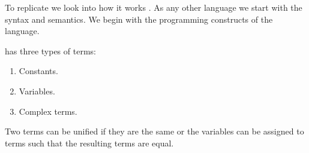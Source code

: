 \documentclass[thesis-solanki.tex]{subfiles}
\begin{document}
To replicate  we look into how it works \cite{webiste:learnprolognow}.
%
As any other language we start with the syntax and semantics.
We begin with the programming constructs of the language.

 has three types of terms:
\begin{enumerate}
\item Constants.

\item Variables.

\item Complex terms.
\end{enumerate}

Two terms can be unified if they are the same or the variables can be assigned to terms such that the resulting
terms are equal.
\end{document}
